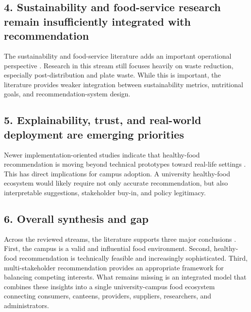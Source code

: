 \documentclass[journal]{IEEEtran}
\begin{document}
\subsection{4. Sustainability and food-service research remain
insufficiently integrated with
recommendation}\label{sustainability-and-food-service-research-remain-insufficiently-integrated-with-recommendation}

The sustainability and food-service literature adds an important
operational perspective
\cite{peixoto2026sustainability, guimaraes2024waste}. Research in this
stream still focuses heavily on waste reduction, especially
post-distribution and plate waste. While this is important, the
literature provides weaker integration between sustainability metrics,
nutritional goals, and recommendation-system design.

\subsection{5. Explainability, trust, and real-world deployment are
emerging
priorities}\label{explainability-trust-and-real-world-deployment-are-emerging-priorities}

Newer implementation-oriented studies indicate that healthy-food
recommendation is moving beyond technical prototypes toward real-life
settings
\cite{workplace2025explanation, wang2024hypergraph, rostami2024group}.
This has direct implications for campus adoption. A university
healthy-food ecosystem would likely require not only accurate
recommendation, but also interpretable suggestions, stakeholder buy-in,
and policy legitimacy.

\subsection{6. Overall synthesis and
gap}\label{overall-synthesis-and-gap}

Across the reviewed streams, the literature supports three major
conclusions
\cite{bondevik2024, caruso2025campus, zheng2017msr, peixoto2026sustainability}.
First, the campus is a valid and influential food environment. Second,
healthy-food recommendation is technically feasible and increasingly
sophisticated. Third, multi-stakeholder recommendation provides an
appropriate framework for balancing competing interests. What remains
missing is an integrated model that combines these insights into a
single university-campus food ecosystem connecting consumers, canteens,
providers, suppliers, researchers, and administrators.
\end{document}
